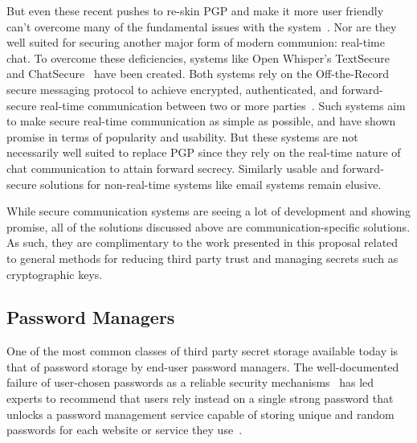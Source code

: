 But even these recent pushes to re-skin PGP and make it more user
friendly can't overcome many of the fundamental issues with the
system~\cite{green-pgp}. Nor are they well suited for securing another
major form of modern communion: real-time chat. To overcome these
deficiencies, systems like Open Whisper's
TextSecure~\cite{openwhisper} and ChatSecure~\cite{chatsecure} have
been created. Both systems rely on the Off-the-Record secure messaging
protocol to achieve encrypted, authenticated, and forward-secure
real-time communication between two or more parties~\cite{otr-v3,
  borisov2004, goldberg2009}. Such systems aim to make secure
real-time communication as simple as possible, and have shown promise
in terms of popularity and usability. But these systems are not
necessarily well suited to replace PGP since they rely on the
real-time nature of chat communication to attain forward
secrecy. Similarly usable and forward-secure solutions for
non-real-time systems like email systems remain elusive.

While secure communication systems are seeing a lot of development and
showing promise, all of the solutions discussed above are
communication-specific solutions. As such, they are complimentary to
the work presented in this proposal related to general methods for
reducing third party trust and managing secrets such as cryptographic
keys.

\subsection{Password Managers}

One of the most common classes of third party secret storage available
today is that of password storage by end-user password managers. The
well-documented failure of user-chosen passwords as a reliable
security mechanisms~\cite{goodin-bible, goodin-passwords} has led
experts to recommend that users rely instead on a single strong
password that unlocks a password management service capable of storing
unique and random passwords for each website or service they
use~\cite{schneier-passwords, krebs-passwords, brodkin-passman}.

